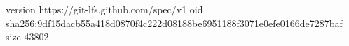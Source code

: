version https://git-lfs.github.com/spec/v1
oid sha256:9df15dacb55a418d0870f4c222d08188be6951188f3071e0efe0166de7287baf
size 43802
